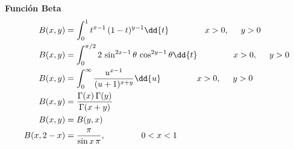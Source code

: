 \textbf{Función Beta}
\begin{align*}
B (x, y) &= \int_{0}^{1} t^{x - 1} \, (1 - t)^{y-1} \dd{t} \hspace{1.5cm} x > 0, \hspace{0.5cm} y > 0 \\
B (x, y) &= \int_{0}^{\pi/2} 2 \, \sin^{2 x - 1} \theta \, \cos^{2 y - 1} \theta \dd{t} \hspace{1.5cm} x > 0, \hspace{0.5cm} y > 0 \\
B (x, y) &= \int_{0}^{\infty} \dfrac{u^{x-1}}{(u + 1)^{x+y}} \dd{u} \hspace{1.5cm} x > 0, \hspace{0.5cm} y > 0 \\
B (x, y) &= \dfrac{\Gamma (x) \, \Gamma (y)}{\Gamma (x + y)} \\
B (x, y) &= B (y, x) \\
B (x, 2-x) &= \dfrac{\pi}{\sin x \, \pi}, \hspace{1.5cm} 0 < x < 1
\end{align*}

